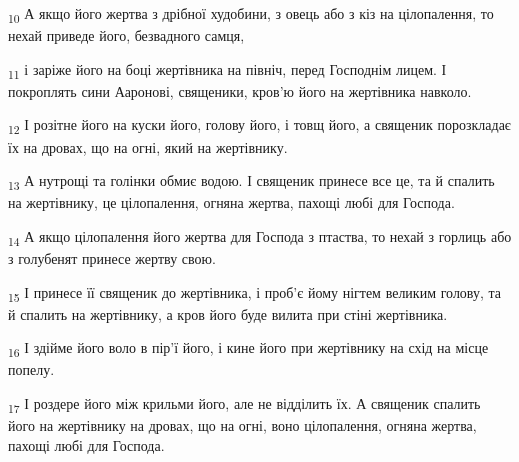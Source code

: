 \begin{tcolorbox}
\textsubscript{10} А якщо його жертва з дрібної худобини, з овець або з кіз на цілопалення, то нехай приведе його, безвадного самця,
\end{tcolorbox}
\begin{tcolorbox}
\textsubscript{11} і заріже його на боці жертівника на північ, перед Господнім лицем. І покроплять сини Ааронові, священики, кров'ю його на жертівника навколо.
\end{tcolorbox}
\begin{tcolorbox}
\textsubscript{12} І розітне його на куски його, голову його, і товщ його, а священик порозкладає їх на дровах, що на огні, який на жертівнику.
\end{tcolorbox}
\begin{tcolorbox}
\textsubscript{13} А нутрощі та голінки обмиє водою. І священик принесе все це, та й спалить на жертівнику, це цілопалення, огняна жертва, пахощі любі для Господа.
\end{tcolorbox}
\begin{tcolorbox}
\textsubscript{14} А якщо цілопалення його жертва для Господа з птаства, то нехай з горлиць або з голубенят принесе жертву свою.
\end{tcolorbox}
\begin{tcolorbox}
\textsubscript{15} І принесе її священик до жертівника, і проб'є йому нігтем великим голову, та й спалить на жертівнику, а кров його буде вилита при стіні жертівника.
\end{tcolorbox}
\begin{tcolorbox}
\textsubscript{16} І здійме його воло в пір'ї його, і кине його при жертівнику на схід на місце попелу.
\end{tcolorbox}
\begin{tcolorbox}
\textsubscript{17} І роздере його між крильми його, але не відділить їх. А священик спалить його на жертівнику на дровах, що на огні, воно цілопалення, огняна жертва, пахощі любі для Господа.
\end{tcolorbox}
